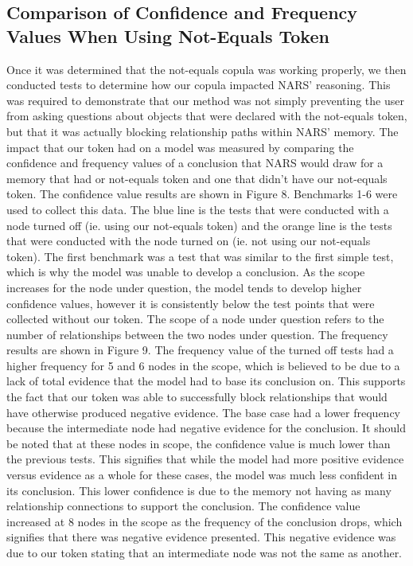 \documentclass[conference]{IEEEtran}
\begin{document}
\subsection{Comparison of Confidence and Frequency Values When Using Not-Equals Token}
	Once it was determined that the not-equals copula was working properly, we then conducted tests to determine how our copula impacted NARS' reasoning. This was required to demonstrate that our method was not simply preventing the user from asking questions about objects that were declared with the not-equals token, but that it was actually blocking relationship paths within NARS' memory. The impact that our token had on a model was measured by comparing the confidence and frequency values of a conclusion that NARS would draw for a memory that had or not-equals token and one that didn't have our not-equals token. The confidence value results are shown in Figure 8. Benchmarks 1-6 were used to collect this data. The blue line is the tests that were conducted with a node turned off (ie. using our not-equals token) and the orange line is the tests that were conducted with the node turned on (ie. not using our not-equals token). The first benchmark was a test that was similar to the first simple test, which is why the model was unable to develop a conclusion. As the scope increases for the node under question, the model tends to develop higher confidence values, however it is consistently below the test points that were collected without our token. The scope of a node under question refers to the number of relationships between the two nodes under question. The frequency results are shown in Figure 9. The frequency value of the turned off tests had a higher frequency for 5 and 6 nodes in the scope, which is believed to be due to a lack of total evidence that the model had to base its conclusion on. This supports the fact that our token was able to successfully block relationships that would have otherwise produced negative evidence. The base case had a lower frequency because the intermediate node had negative evidence for the conclusion. It should be noted that at these nodes in scope, the confidence value is much lower than the previous tests. This signifies that while the model had more positive evidence versus evidence as a whole for these cases, the model was much less confident in its conclusion. This lower confidence is due to the memory not having as many relationship connections to support the conclusion. The confidence value increased at 8 nodes in the scope as the frequency of the conclusion drops, which signifies that there was negative evidence presented. This negative evidence was due to our token stating that an intermediate node was not the same as another.
	
\end{document}
